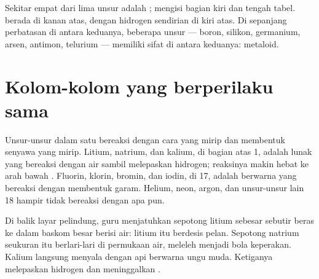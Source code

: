 \begin{proposition}\label{prop:g9:periodic-table-first-look:where}
Sekitar empat dari lima unsur adalah ;  mengisi bagian kiri
dan tengah tabel.  berada di kanan atas, dengan hidrogen sendirian
di kiri atas. Di sepanjang perbatasan di antara keduanya, beberapa unsur
--- boron, silikon, germanium, arsen, antimon, telurium --- memiliki
sifat di antara keduanya: metaloid.
\end{proposition}

\section{Kolom-kolom yang berperilaku sama}

\begin{proposition}\label{prop:g9:periodic-table-first-look:alike}
Unsur-unsur dalam satu  bereaksi dengan cara yang mirip dan
membentuk senyawa yang mirip. Litium, natrium, dan kalium, di bagian
atas  1, adalah  lunak yang bereaksi dengan air sambil
melepaskan hidrogen; reaksinya makin hebat ke arah bawah .
Fluorin, klorin, bromin, dan iodin, di  17, adalah 
berwarna yang bereaksi dengan  membentuk garam. Helium, neon, argon,
dan unsur-unsur lain  18 hampir tidak bereaksi dengan apa pun.
\end{proposition}

\begin{inthelab}
Di balik layar pelindung, guru menjatuhkan sepotong litium sebesar
sebutir beras ke dalam baskom besar berisi air: litium itu berdesis
pelan. Sepotong natrium seukuran itu berlari-lari di permukaan air,
meleleh menjadi bola keperakan. Kalium langsung menyala dengan api
berwarna ungu muda. Ketiganya melepaskan hidrogen dan meninggalkan
.
\end{inthelab}

